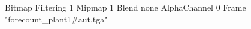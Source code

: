 {Bitmap
	{Filtering 1}
	{Mipmap 1}
	{Blend none}
	{AlphaChannel 0}
	{Frame "forecount_plant1#aut.tga"}
}
